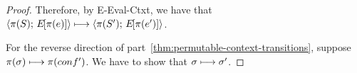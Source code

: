 \begin{proof}
  Therefore, by {\sc E-Eval-Ctxt}, we have that
  $\langle \pi(S);\, E\hspace{-1mm}\left[\pi(e)\right] \rangle \longmapsto
  \langle \pi(S');\, E\hspace{-1mm}\left[\pi(e')\right] \rangle$.


  For the reverse direction of
  part~\ref{thm:permutable-context-transitions}, suppose $\pi(\sigma)
  \longmapsto \pi(conf')$.  We have to show that $\sigma \longmapsto
  \sigma'$.

\end{proof}
